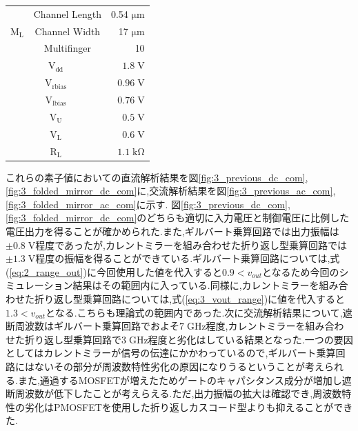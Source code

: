 \begin{table}[!b]
\begin{tabular}{c|c|r}
                    &   Channel Length   &   0.54 $\mathrm{\mu m}$   \\
                    \cline{2-3}
                    $\mathrm{M_{L}}$   &   Channel Width   &   17 $\mathrm{\mu m}$   \\
                    \cline{2-3}
                        &   Multifinger   & 10    \\
                    \hline
                    \multicolumn{2}{c|}{$\mathrm{V_{dd}}$} &   $1.8\;\mathrm{V}$   \\
                    \hline
                    \multicolumn{2}{c|}{$\mathrm{V_{rbias}}$} &   $0.96\;\mathrm{V}$   \\
                    \hline
                    \multicolumn{2}{c|}{$\mathrm{V_{lbias}}$} &   $0.76\;\mathrm{V}$   \\
                    \hline
                    \multicolumn{2}{c|}{$\mathrm{V_{U}}$} &   $0.5\;\mathrm{V}$   \\
                    \hline
                    \multicolumn{2}{c|}{$\mathrm{V_{L}}$} &   $0.6\;\mathrm{V}$   \\
                    \hline
                    \multicolumn{2}{c|}{$\mathrm{R_{L}}$} &   $1.1\;\mathrm{k \Omega}$   \\
                    \hline
            \end{tabular}
        \end{table}
        これらの素子値においての直流解析結果を図\ref{fig:3_previous_dc_com},\ref{fig:3_folded_mirror_dc_com}に,交流解析結果を図\ref{fig:3_previous_ac_com},\ref{fig:3_folded_mirror_ac_com}に示す.
        図\ref{fig:3_previous_dc_com},\ref{fig:3_folded_mirror_dc_com}のどちらも適切に入力電圧と制御電圧に比例した電圧出力を得ることが確かめられた.また,ギルバート乗算回路では出力振幅は$\pm 0.8\mathrm{\;V}$程度であったが,カレントミラーを組み合わせた折り返し型乗算回路では$\pm 1.3\mathrm{\;V}$程度の振幅を得ることができている.ギルバート乗算回路については,式(\ref{eq:2_range_out})に今回使用した値を代入すると$0.9 <v_{out}$となるため今回のシミュレーション結果はその範囲内に入っている.同様に,カレントミラーを組み合わせた折り返し型乗算回路については,式(\ref{eq:3_vout_range})に値を代入すると$1.3 < v_{out}$となる.こちらも理論式の範囲内であった.次に交流解析結果について,遮断周波数はギルバート乗算回路でおよそ$7\;\mathrm{GHz}$程度,カレントミラーを組み合わせた折り返し型乗算回路で$3\;\mathrm{GHz}$程度と劣化はしている結果となった.一つの要因としてはカレントミラーが信号の伝達にかかわっているので,ギルバート乗算回路にはないその部分が周波数特性劣化の原因になりうるということが考えられる.また,通過するMOSFETが増えたためゲートのキャパシタンス成分が増加し遮断周波数が低下したことが考えらえる.ただ,出力振幅の拡大は確認でき,周波数特性の劣化はPMOSFETを使用した折り返しカスコード型よりも抑えることができた.\clearpage
